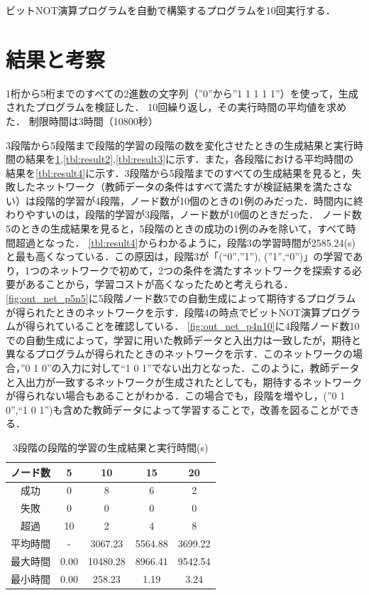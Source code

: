 \documentclass[exploratorypaper]{jsaiart} %
\begin{document}
ビットNOT演算プログラムを自動で構築するプログラムを10回実行する．
\section{結果と考察}
1桁から5桁までのすべての2進数の文字列（”0”から”1 1 1 1 1”）を使って，生成されたプログラムを検証した．
10回繰り返し，その実行時間の平均値を求めた．
制限時間は3時間（10800秒）

3段階から5段階まで段階的学習の段階の数を変化させたときの生成結果と実行時間の結果を\ref{tbl:result1},\ref{tbl:result2},\ref{tbl:result3}に示す．また，各段階における平均時間の結果を\ref{tbl:result4}に示す．3段階から5段階までのすべての生成結果を見ると，失敗したネットワーク（教師データの条件はすべて満たすが検証結果を満たさない）は段階的学習が4段階，ノード数が10個のときの1例のみだった．時間内に終わりやすいのは，段階的学習が3段階，ノード数が10個のときだった．
ノード数5のときの生成結果を見ると，5段階のときの成功の1例のみを除いて，すべて時間超過となった．
\ref{tbl:result4}からわかるように，段階3の学習時間が2585.24(s)と最も高くなっている．この原因は，段階3が「(“0”,”1”), (”1”,“0”)」の学習であり，1つのネットワークで初めて，2つの条件を満たすネットワークを探索する必要があることから，学習コストが高くなったためと考えられる．
\ref{fig:out_net_p5n5}に5段階ノード数5での自動生成によって期待するプログラムが得られたときのネットワークを示す．段階4の時点でビットNOT演算プログラムが得られていることを確認している．
\ref{fig:out_net_p4n10}に4段階ノード数10での自動生成によって，学習に用いた教師データと入出力は一致したが，期待と異なるプログラムが得られたときのネットワークを示す．このネットワークの場合，”0 1 0”の入力に対して“1 0 1”でない出力となった．このように，教師データと入出力が一致するネットワークが生成されたとしても，期待するネットワークが得られない場合もあることがわかる．この場合でも，段階を増やし，(”0 1 0”,“1 0 1”)も含めた教師データによって学習することで，改善を図ることができる．


\begin{table}[t]
\caption{3段階の段階的学習の生成結果と実行時間(s)}
\label{tbl:result1}
\begin{tabular}{c|cccc}
    ノード数&	5&	10&	15&	20\\
    \hline
    成功&	0&	8&	6&	2\\
    失敗&	0&	0&	0&	0\\
    超過&	10&	2&	4&	8\\
    \hline \hline
    平均時間&	- &	3067.23&	5564.88&	3699.22\\
    最大時間&	0.00&	10480.28&	8966.41&	9542.54\\
    最小時間&	0.00&	258.23&	1.19&	3.24\\
    \hline
\end{tabular}
\end{table}
\end{document}
